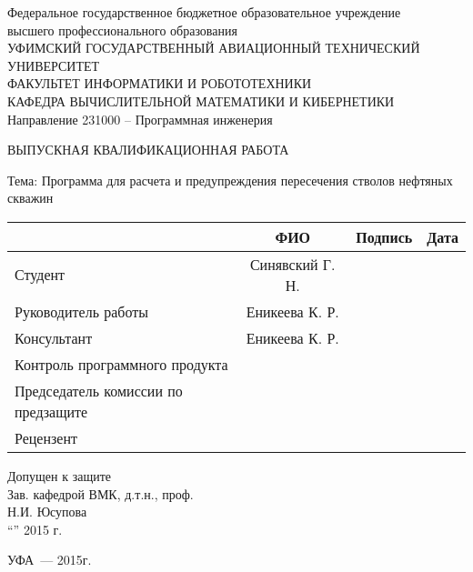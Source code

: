 \begin{titlepage}
\newpage

\begin{center}
Федеральное государственное бюджетное образовательное учреждение\\
высшего профессионального образования \\
\vspace{0.5cm}
УФИМСКИЙ ГОСУДАРСТВЕННЫЙ АВИАЦИОННЫЙ ТЕХНИЧЕСКИЙ УНИВЕРСИТЕТ\\
\vspace{0.5cm}
ФАКУЛЬТЕТ  ИНФОРМАТИКИ  И  РОБОТОТЕХНИКИ \\
\vspace{0.5cm}
КАФЕДРА  ВЫЧИСЛИТЕЛЬНОЙ  МАТЕМАТИКИ  И  КИБЕРНЕТИКИ\\
\vspace{0.5cm}
Направление 231000 – Программная инженерия
\end{center}

\vspace{2em}

\begin{center}
\Large {ВЫПУСКНАЯ КВАЛИФИКАЦИОННАЯ РАБОТА}

\vspace{2.5em}

Тема: Программа для расчета и предупреждения пересечения стволов нефтяных скважин
\end{center}

\vspace{3em}
\noindent
\begin{tabularx}{\textwidth}{|l|c|X|X|}
\hline
& ФИО & Подпись & Дата\\
\hline
Студент & Синявский Г. Н. &&\\
\hline
Руководитель работы & Еникеева К. Р. &&\\
\hline
Консультант & Еникеева К. Р. &&\\
\hline
Контроль программного продукта &&&\\
\hline
Председатель комиссии по предзащите &&&\\
\hline
Рецензент &&& \\
\hline
\end{tabularx}

\vspace{2em}
\center Допущен к защите\\
Зав. кафедрой  ВМК, д.т.н., проф.\\
\underline{\hspace{5cm}} Н.И. Юсупова\\
“\underline{\hspace{1cm}}”\underline{\hspace{5cm}} 2015 г.

\vspace{\fill}

\begin{center}
УФА~--- 2015г.
\end{center}

\end{titlepage}
